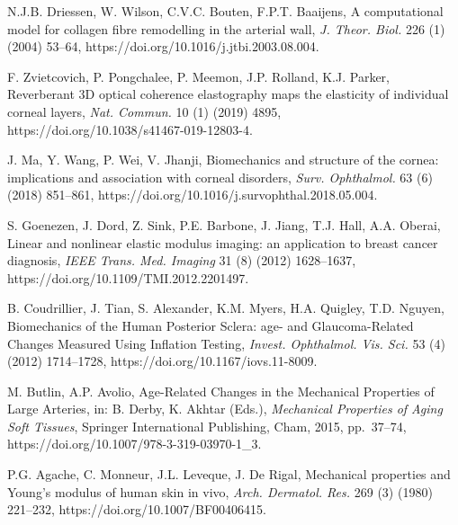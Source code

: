 \documentclass[11pt]{article}
\begin{document}
\begin{list}{}{%
  \setlength{\leftmargin}{2em}%
  \setlength{\itemindent}{-2em}%
  \setlength{\itemsep}{0.5em}%
  \setlength{\parsep}{0pt}%
}

\item [5] N.J.B. Driessen, W. Wilson, C.V.C. Bouten, F.P.T.
Baaijens, A computational model for collagen fibre remodelling
in the arterial wall, \emph{J. Theor. Biol.} 226 (1) (2004)
53--64, https://doi.org/10.1016/j.jtbi.2003.08.004.

\item [6] F. Zvietcovich, P. Pongchalee, P. Meemon, J.P.
Rolland, K.J. Parker, Reverberant 3D optical coherence
elastography maps the elasticity of individual corneal layers,
\emph{Nat. Commun.} 10 (1) (2019) 4895,
https://doi.org/10.1038/s41467-019-12803-4.

\item [7] J. Ma, Y. Wang, P. Wei, V. Jhanji, Biomechanics and
structure of the cornea: implications and association with
corneal disorders, \emph{Surv. Ophthalmol.} 63 (6) (2018)
851--861, https://doi.org/10.1016/j.survophthal.2018.05.004.

\item [8] S. Goenezen, J. Dord, Z. Sink, P.E. Barbone, J. Jiang,
T.J. Hall, A.A. Oberai, Linear and nonlinear elastic modulus
imaging: an application to breast cancer diagnosis, \emph{IEEE
Trans. Med. Imaging} 31 (8) (2012) 1628--1637,
https://doi.org/10.1109/TMI.2012.2201497.

\item [9] B. Coudrillier, J. Tian, S. Alexander, K.M. Myers,
H.A. Quigley, T.D. Nguyen, Biomechanics of the Human Posterior
Sclera: age- and Glaucoma-Related Changes Measured Using
Inflation Testing, \emph{Invest. Ophthalmol. Vis. Sci.} 53 (4)
(2012) 1714--1728, https://doi.org/10.1167/iovs.11-8009.

\item [10] M. Butlin, A.P. Avolio, Age-Related Changes in the
Mechanical Properties of Large Arteries, in: B. Derby, K.
Akhtar (Eds.), \emph{Mechanical Properties of Aging Soft
Tissues}, Springer International Publishing, Cham, 2015,
pp.~37--74, https://doi.org/10.1007/978-3-319-03970-1\_3.

\item [11] P.G. Agache, C. Monneur, J.L. Leveque, J. De Rigal,
Mechanical properties and Young's modulus of human skin in
vivo, \emph{Arch. Dermatol. Res.} 269 (3) (1980) 221--232,
https://doi.org/10.1007/BF00406415.


\end{list}
\end{document}

